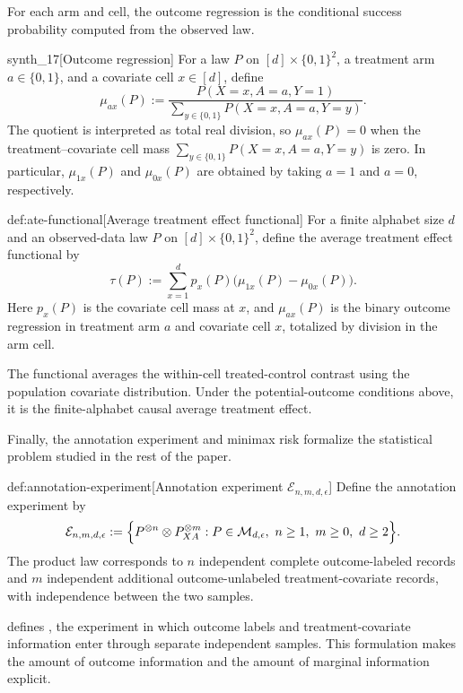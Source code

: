 \documentclass[11pt]{article}
\begin{document}
For each arm and cell, the outcome regression  is the conditional success probability computed from the observed law.

\begin{definitionv}{synth_17}[Outcome regression]
For a law \(P\) on \([d]\times\{0,1\}^2\), a treatment arm \(a\in\{0,1\}\), and a covariate cell \(x\in[d]\), define
\[
\mu_{ax}(P)
:=
\frac{P(X=x,A=a,Y=1)}
{\sum_{y\in\{0,1\}} P(X=x,A=a,Y=y)} .
\]
The quotient is interpreted as total real division, so \(\mu_{ax}(P)=0\) when the treatment--covariate cell mass \(\sum_{y\in\{0,1\}}P(X=x,A=a,Y=y)\) is zero. In particular, \(\mu_{1x}(P)\) and \(\mu_{0x}(P)\) are obtained by taking \(a=1\) and \(a=0\), respectively.
\end{definitionv}

\begin{definitionv}{def:ate-functional}[Average treatment effect functional]
For a finite alphabet size \(d\) and an observed-data law \(P\) on \([d]\times\{0,1\}^2\), define the average treatment effect functional by
\[
\tau(P):=\sum_{x=1}^{d}p_x(P)\bigl(\mu_{1x}(P)-\mu_{0x}(P)\bigr).
\]
Here \(p_x(P)\) is the covariate cell mass at \(x\), and \(\mu_{ax}(P)\) is the binary outcome regression in treatment arm \(a\) and covariate cell \(x\), totalized by division in the arm cell.
\end{definitionv}

The functional  averages the within-cell treated-control contrast using the population covariate distribution. Under the potential-outcome conditions above, it is the finite-alphabet causal average treatment effect.

Finally, the annotation experiment and minimax risk formalize the statistical problem studied in the rest of the paper.

\begin{definitionv}{def:annotation-experiment}[Annotation experiment \(\mathcal E_{n,m,d,\epsilon}\)]
Define the annotation experiment by
\[
\mathcal E_{n,m,d,\epsilon}
:=
\Bigl\{
P^{\otimes n}\otimes P_{XA}^{\otimes m}:
P\in\mathcal M_{d,\epsilon},\ n\ge1,\ m\ge0,\ d\ge2
\Bigr\}.
\]
The product law corresponds to \(n\) independent complete outcome-labeled records and \(m\) independent additional outcome-unlabeled treatment-covariate records, with independence between the two samples.
\end{definitionv}

 defines , the experiment in which outcome labels and treatment-covariate information enter through separate independent samples. This formulation makes the amount of outcome information and the amount of marginal information explicit.
\end{document}
